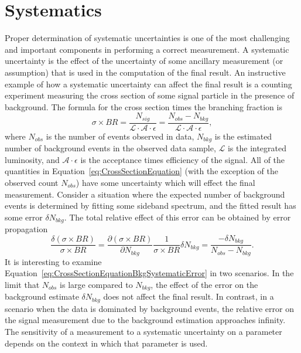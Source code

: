 \ifx\master\undefined\fi

\chapter{Systematics} \label{ch:systematics} Proper determination of systematic
uncertainties is one of the most challenging and important components in
performing a correct measurement.  A systematic uncertainty is the effect of the
uncertainty of some ancillary measurement (or assumption) that is used in the
computation of the final result.  An instructive example of how a systematic
uncertainty can affect the final result is a counting experiment measuring the cross
section of some signal particle in the presence of background.  The formula for
the cross section times the branching fraction is
\begin{equation}
  \sigma \times BR = \frac{N_{sig}}{\mathcal{L} \cdot \mathcal {A} \cdot
  \epsilon} = \frac{N_{obs}-N_{bkg}}{\mathcal{L} \cdot \mathcal {A} \cdot
  \epsilon}, \label{eq:CrossSectionEquation}
\end{equation}
where $N_{obs}$ is the number of events observed in data, $N_{bkg}$ is the
estimated number of background events in the observed data sample, $\mathcal{L}$
is the integrated luminosity, and $\mathcal{A} \cdot \epsilon$ is the acceptance
times efficiency of the signal.  All of the quantities in
Equation~\ref{eq:CrossSectionEquation} (with the exception of the observed
count $N_{obs}$) have some uncertainty which will effect the final measurement.
Consider a situation where the expected number of background events is
determined by fitting some sideband spectrum, and the fitted result has some
error $\delta N_{bkg}$.  The total relative effect of this error can
be obtained by error propagation
\begin{equation}
  \frac{\delta (\sigma \times BR)}{\sigma \times BR} = \frac{\partial(\sigma
  \times BR)}{\partial N_{bkg}}  \frac{1}{\sigma \times BR} \delta N_{bkg} =
  \frac{-\delta N_{bkg}} {N_{obs}-N_{bkg}}.
  \label{eq:CrossSectionEquationBkgSystematicError}
\end{equation}
It is interesting to examine
Equation~\ref{eq:CrossSectionEquationBkgSystematicError} in two scenarios.  In
the limit that $N_{obs}$ is large compared to $N_{bkg}$, the effect of the error
on the background estimate $\delta N_{bkg}$ does not affect the final result.
In contrast, in a scenario when the data is dominated by background events, the
relative error on the signal measurement due to the background estimation
approaches infinity.  The sensitivity of a measurement to a systematic
uncertainty on a parameter depends on the context in which that parameter is
used.

